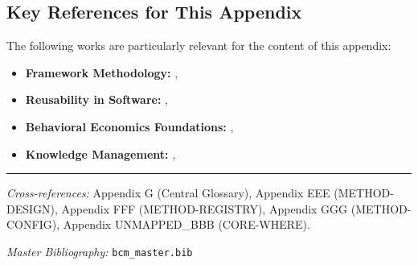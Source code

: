 \vspace{0.5em}

\subsection{Key References for This Appendix}

The following works are particularly relevant for the content of this appendix:

\begin{itemize}[nosep]
    \item \textbf{Framework Methodology:} \citet{kuhn1962structure}, \citet{lakatos1970falsification}
    \item \textbf{Reusability in Software:} \citet{parnas1972criteria}, \citet{gamma1994design}
    \item \textbf{Behavioral Economics Foundations:} \citet{kahneman1979prospectprospect}, \citet{thaler2008nudge}
    \item \textbf{Knowledge Management:} \citet{nonaka1995knowledge}, \citet{davenport1998working}
\end{itemize}

\nocite{bcm_master}



\vspace{1em}
\hrule
\vspace{0.5em}

\noindent\textit{Cross-references:}
Appendix G (Central Glossary),
Appendix EEE (METHOD-DESIGN),
Appendix FFF (METHOD-REGISTRY),
Appendix GGG (METHOD-CONFIG),
Appendix UNMAPPED_BBB (CORE-WHERE).

\noindent\textit{Master Bibliography:} \texttt{bcm\_master.bib}


